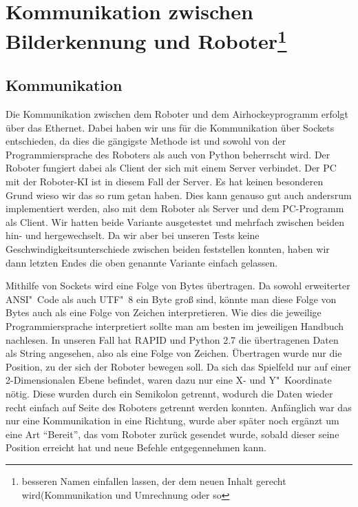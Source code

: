 
\chapter{Kommunikation zwischen Bilderkennung und Roboter\footnote{besseren Namen einfallen lassen, der dem neuen Inhalt gerecht wird(Kommunikation und Umrechnung oder so}}
\label{cha:Kommunikation zwischen Bilderkennung und Roboter}
\section{Kommunikation}
Die Kommunikation zwischen dem Roboter und dem Airhockeyprogramm erfolgt über das Ethernet. Dabei haben wir uns für die Kommunikation über Sockets entschieden, da dies die gängigste Methode ist und sowohl von der Programmiersprache des Roboters als auch von Python beherrscht wird. Der Roboter fungiert dabei als Client der sich mit einem Server verbindet. Der PC mit der Roboter-KI ist in diesem Fall der Server. Es hat keinen besonderen Grund wieso wir das so rum getan haben. Dies kann genauso gut auch andersrum implementiert werden, also mit dem Roboter als Server und dem PC-Programm als Client. Wir hatten beide Variante ausgetestet und mehrfach zwischen beiden hin- und hergewechselt. Da wir aber bei unseren Tests keine Geschwindigkeitsunterschiede zwischen beiden feststellen konnten, haben wir dann letzten Endes die oben genannte Variante einfach gelassen.

Mithilfe von Sockets wird eine Folge von Bytes übertragen. Da sowohl erweiterter ANSI"~Code als auch UTF"~8 ein Byte groß sind, könnte man diese Folge von Bytes auch als eine Folge von Zeichen interpretieren. Wie dies die jeweilige Programmiersprache interpretiert sollte man am besten im jeweiligen Handbuch nachlesen. In unseren Fall hat RAPID und Python 2.7 die übertragenen Daten als String angesehen, also als eine Folge von Zeichen. 
Übertragen wurde nur die Position, zu der sich der Roboter bewegen soll.  Da sich das Spielfeld nur auf einer 2-Dimensionalen Ebene befindet, waren dazu nur eine X- und Y"~Koordinate nötig. Diese wurden durch ein Semikolon getrennt, wodurch die Daten wieder recht einfach auf Seite des Roboters getrennt werden konnten. Anfänglich war das nur eine Kommunikation in eine Richtung, wurde aber später noch ergänzt um eine Art \enquote{Bereit}, das vom Roboter zurück gesendet wurde, sobald dieser seine Position erreicht hat und neue Befehle entgegennehmen kann. 

